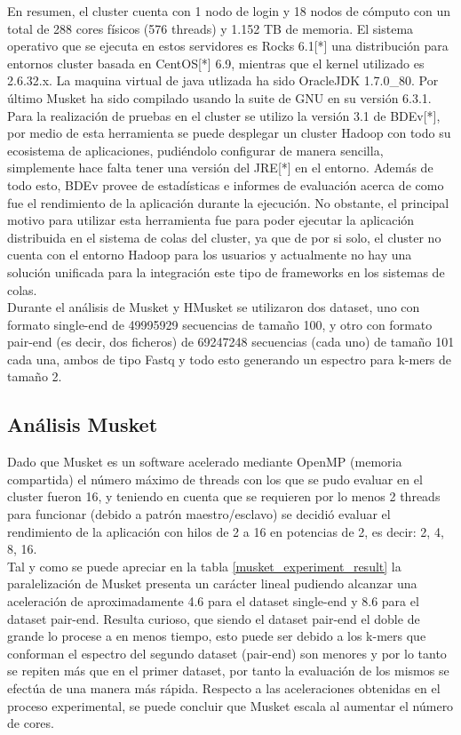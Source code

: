 \documentclass[conference]{IEEEtran}
\begin{document}
En resumen, el cluster cuenta con 1 nodo de login y 18 nodos de cómputo con un total de 288 cores físicos (576 threads) y 1.152 TB de memoria. El sistema operativo que se ejecuta en estos servidores es Rocks 6.1[*] una distribución para entornos cluster basada en CentOS[*] 6.9, mientras que el kernel utilizado es 2.6.32.x. La maquina virtual de java utlizada ha sido OracleJDK 1.7.0\_80. Por último Musket ha sido compilado usando la suite de GNU en su versión 6.3.1.\\

Para la realización de pruebas en el cluster se utilizo la versión 3.1 de BDEv[*], por medio de esta herramienta se puede desplegar un cluster Hadoop con todo su ecosistema de aplicaciones, pudiéndolo configurar de manera sencilla, simplemente hace falta tener una versión del JRE[*] en el entorno. Además de todo esto, BDEv provee de estadísticas e informes de evaluación acerca de como fue el rendimiento de la aplicación durante la ejecución. No obstante, el principal motivo para utilizar esta herramienta fue para poder ejecutar la aplicación distribuida en el sistema de colas del cluster, ya que de por si solo, el cluster no cuenta con el entorno Hadoop para los usuarios y actualmente no hay una solución unificada para la integración este tipo de frameworks en los sistemas de colas.\\

Durante el análisis de Musket y HMusket se utilizaron dos dataset, uno con formato single-end de 49995929 secuencias de tamaño 100, y otro con formato pair-end (es decir, dos ficheros) de 69247248 secuencias (cada uno) de tamaño 101 cada una, ambos de tipo Fastq y todo esto generando un espectro para k-mers de tamaño 2.\\

\subsection{Análisis Musket}
Dado que Musket es un software acelerado mediante OpenMP (memoria compartida) el número máximo de threads con los que se pudo evaluar en el cluster fueron 16, y teniendo en cuenta que se requieren por lo menos 2 threads para funcionar (debido a patrón maestro/esclavo) se decidió evaluar el rendimiento de la aplicación con hilos de 2 a 16 en potencias de 2, es decir: 2, 4, 8, 16.\\

Tal y como se puede apreciar en la tabla \ref{musket_experiment_result} la paralelización de Musket presenta un carácter lineal pudiendo alcanzar una aceleración de aproximadamente 4.6 para el dataset single-end y 8.6 para el dataset pair-end. Resulta curioso, que siendo el dataset pair-end el doble de grande lo procese a en menos tiempo, esto puede ser debido a los k-mers que conforman el espectro del segundo dataset (pair-end) son menores y por lo tanto se repiten más que en el primer dataset, por tanto la evaluación de los mismos se efectúa de una manera más rápida. Respecto a las aceleraciones obtenidas en el proceso experimental, se puede concluir que Musket escala al aumentar el número de cores.
\end{document}
